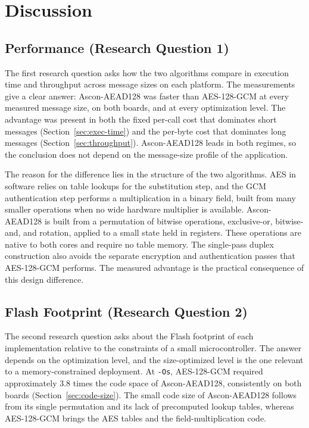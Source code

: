 \chapter{Discussion}

\section{Performance (Research Question 1)}

The first research question asks how the two algorithms compare in execution
time and throughput across message sizes on each platform.
The measurements give a clear answer: Ascon-AEAD128 was faster than AES-128-GCM
at every measured message size, on both boards, and at every optimization level.
The advantage was present in both the fixed per-call cost that dominates short
messages (Section~\ref{sec:exec-time}) and the per-byte cost that dominates long
messages (Section~\ref{sec:throughput}).
Ascon-AEAD128 leads in both regimes, so the conclusion does not depend on the
message-size profile of the application.

The reason for the difference lies in the structure of the two algorithms.
AES in software relies on table lookups for the substitution step, and the GCM
authentication step performs a multiplication in a binary field, built from many
smaller operations when no wide hardware multiplier is available.
Ascon-AEAD128 is built from a permutation of bitwise operations, exclusive-or,
bitwise-and, and rotation, applied to a small state held in registers.
These operations are native to both cores and require no table memory.
The single-pass duplex construction also avoids the separate encryption and
authentication passes that AES-128-GCM performs.
The measured advantage is the practical consequence of this design difference.

\section{Flash Footprint (Research Question 2)}

The second research question asks about the Flash footprint of each
implementation relative to the constraints of a small microcontroller.
The answer depends on the optimization level, and the size-optimized level is
the one relevant to a memory-constrained deployment.
At \texttt{-Os}, AES-128-GCM required approximately 3.8 times the code space of
Ascon-AEAD128, consistently on both boards (Section~\ref{sec:code-size}).
The small code size of Ascon-AEAD128 follows from its single permutation and its
lack of precomputed lookup tables, whereas AES-128-GCM brings the AES tables
and the field-multiplication code.

